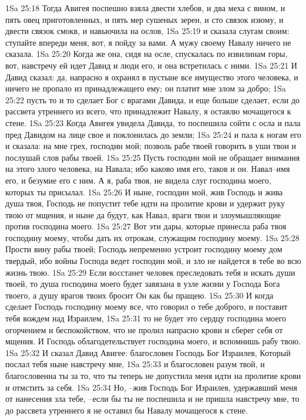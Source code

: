 1Sa 25:18  Тогда Авигея поспешно взяла двести хлебов, и два меха с вином, и пять овец приготовленных, и пять мер сушеных зерен, и сто связок изюму, и двести связок смокв, и навьючила на ослов,
1Sa 25:19  и сказала слугам своим: ступайте впереди меня, вот, я пойду за вами. А мужу своему Навалу ничего не сказала.
1Sa 25:20  Когда же она, сидя на осле, спускалась по извилинам горы, вот, навстречу ей идет Давид и люди его, и она встретилась с ними.
1Sa 25:21  И Давид сказал: да, напрасно я охранял в пустыне все имущество этого человека, и ничего не пропало из принадлежащего ему; он платит мне злом за добро;
1Sa 25:22  пусть то и то сделает Бог с врагами Давида, и еще больше сделает, если до рассвета утреннего из всего, что принадлежит Навалу, я оставлю мочащегося к стене.
1Sa 25:23  Когда Авигея увидела Давида, то поспешила сойти с осла и пала пред Давидом на лице свое и поклонилась до земли;
1Sa 25:24  и пала к ногам его и сказала: на мне грех, господин мой; позволь рабе твоей говорить в уши твои и послушай слов рабы твоей.
1Sa 25:25  Пусть господин мой не обращает внимания на этого злого человека, на Навала; ибо каково имя его, таков и он. Навал--имя его, и безумие его с ним. А я, раба твоя, не видела слуг господина моего, которых ты присылал.
1Sa 25:26  И ныне, господин мой, жив Господь и жива душа твоя, Господь не попустит тебе идти на пролитие крови и удержит руку твою от мщения, и ныне да будут, как Навал, враги твои и злоумышляющие против господина моего.
1Sa 25:27  Вот эти дары, которые принесла раба твоя господину моему, чтобы дать их отрокам, служащим господину моему.
1Sa 25:28  Прости вину рабы твоей; Господь непременно устроит господину моему дом твердый, ибо войны Господа ведет господин мой, и зло не найдется в тебе во всю жизнь твою.
1Sa 25:29  Если восстанет человек преследовать тебя и искать души твоей, то душа господина моего будет завязана в узле жизни у Господа Бога твоего, а душу врагов твоих бросит Он как бы пращею.
1Sa 25:30  И когда сделает Господь господину моему все, что говорил о тебе доброго, и поставит тебя вождем над Израилем,
1Sa 25:31  то не будет это сердцу господина моего огорчением и беспокойством, что не пролил напрасно крови и сберег себя от мщения. И Господь облагодетельствует господина моего, и вспомнишь рабу твою.
1Sa 25:32  И сказал Давид Авигее: благословен Господь Бог Израилев, Который послал тебя ныне навстречу мне,
1Sa 25:33  и благословен разум твой, и благословенна ты за то, что ты теперь не допустила меня идти на пролитие крови и отмстить за себя.
1Sa 25:34  Но, --жив Господь Бог Израилев, удержавший меня от нанесения зла тебе, --если бы ты не поспешила и не пришла навстречу мне, то до рассвета утреннего я не оставил бы Навалу мочащегося к стене.
